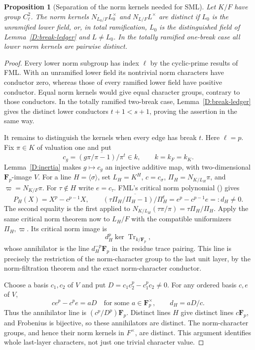 \documentclass[11pt]{amsart}
\newtheorem{proposition}[theorem]{Proposition}
\theoremstyle{definition}
\theoremstyle{remark}
\newcommand{\F}{\mathbf F}
\newcommand{\Tr}{\operatorname{Tr}}
\begin{document}
\begin{proposition}[Separation of the norm kernels needed for SML]
\label{D:norm-separation}
Let $K/F$ have group $C_\ell^2$. The norm kernels
$N_{L_0/F}L_0^\times$ and $N_{L/F}L^\times$ are distinct if
$L_0$ is the unramified lower field, or, in total ramification,
$L_0$ is the distinguished field of Lemma~\ref{D:break-ledger} and
$L\ne L_0$. In the totally ramified one-break case all lower norm
kernels are pairwise distinct.
\end{proposition}
\begin{proof}
Every lower norm subgroup has index $\ell$ by the cyclic-prime results
of FML. With an unramified lower field its nontrivial norm characters
have conductor zero, whereas those of every ramified lower field
have positive conductor. Equal norm kernels would give equal character
groups, contrary to those conductors. In the totally ramified two-break
case, Lemma~\ref{D:break-ledger} gives the distinct lower conductors
$t+1<s+1$, proving the assertion in the same way.

It remains to distinguish the kernels when every edge has break $t$.
Here $\ell=p$. Fix $\pi\in K$ of valuation one and put
\[
 c_g=\overline{(g\pi/\pi-1)/\pi^t}\in k,
       \qquad k=k_F=k_K.
\]
Lemma~\ref{D:inertia} makes $g\mapsto c_g$ an injective additive
map, with two-dimensional $\F_p$-image $V$. For a line
$H=\langle\sigma\rangle$, set $L_H=K^H$, $c=c_\sigma$,
$\Pi_H=N_{K/L_H}\pi$, and $\varpi=N_{K/F}\pi$.
For $\tau\notin H$ write $e=c_\tau$. FML's critical norm polynomial
(\cite[Proposition~3.3]{Ueda}) gives
\[
 P_H(X)=X^p-c^{p-1}X,\qquad
 \overline{(\tau\Pi_H/\Pi_H-1)/\Pi_H^t}
       =e^p-c^{p-1}e=:d_H\ne0.
\]
The second equality is the first applied to
$N_{K/L_H}(\tau\pi/\pi)=\tau\Pi_H/\Pi_H$.
Apply the same critical norm theorem now to $L_H/F$ with the
compatible uniformizers $\Pi_H,\varpi$. Its critical norm image is
\[
 d_H^p\ker\Tr_{k/\F_p},
\]
whose annihilator is the line $d_H^{-p}\F_p$ in the residue trace
pairing. This line is precisely the restriction of the norm-character
group to the last unit layer, by the norm-filtration theorem and the
exact norm-character conductor.

Choose a basis $c_1,c_2$ of $V$ and put
$D=c_1c_2^p-c_1^pc_2\ne0$. For any ordered basis $c,e$ of $V$,
\[
 c e^p-c^pe=aD\quad\text{for some }a\in\F_p^\times,
 \qquad d_H=aD/c.
\]
Thus the annihilator line is $(c^p/D^p)\F_p$.
Distinct lines $H$ give distinct lines $c\F_p$, and Frobenius is
bijective, so these annihilators are distinct. The norm-character
groups, and hence their norm kernels in $F^\times$, are distinct.
This argument identifies whole last-layer characters, not just one
trivial character value.
\end{proof}
\end{document}
